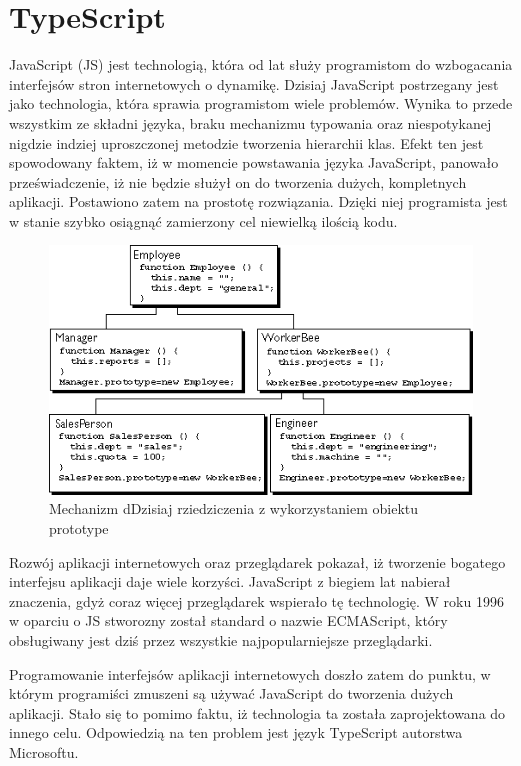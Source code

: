 \chapter{TypeScript}
JavaScript (JS) jest technologią, która od lat służy programistom do wzbogacania interfejsów stron internetowych o dynamikę. Dzisiaj JavaScript postrzegany jest jako technologia, która sprawia programistom wiele problemów. Wynika to przede wszystkim ze składni języka, braku mechanizmu typowania oraz niespotykanej nigdzie indziej  uproszczonej metodzie tworzenia hierarchii klas. Efekt ten jest spowodowany faktem, iż w momencie powstawania języka JavaScript, panowało przeświadczenie, iż nie będzie służył on do tworzenia dużych, kompletnych aplikacji. Postawiono zatem na prostotę rozwiązania. Dzięki niej programista jest w stanie szybko osiągnąć zamierzony cel niewielką ilością kodu.

\begin{figure}[h]
	\includegraphics[width=140mm]{./img/javascript-inheritance.png}
	\caption{Mechanizm dDzisiaj rziedziczenia z wykorzystaniem obiektu prototype}
	\label{fig:javascript-inheritance}
\end{figure}

Rozwój aplikacji internetowych oraz przeglądarek pokazał, iż tworzenie bogatego interfejsu aplikacji daje wiele korzyści. JavaScript z biegiem lat nabierał znaczenia, gdyż coraz więcej przeglądarek wspierało tę technologię. W roku 1996 w oparciu o JS stworozny został standard o nazwie ECMAScript, który obsługiwany jest dziś przez wszystkie najpopularniejsze przeglądarki. 

Programowanie interfejsów aplikacji internetowych doszło zatem do punktu, w którym programiści zmuszeni są używać JavaScript do tworzenia dużych aplikacji. Stało się to pomimo faktu, iż technologia ta została zaprojektowana do innego celu. Odpowiedzią na ten problem jest język TypeScript autorstwa Microsoftu.

